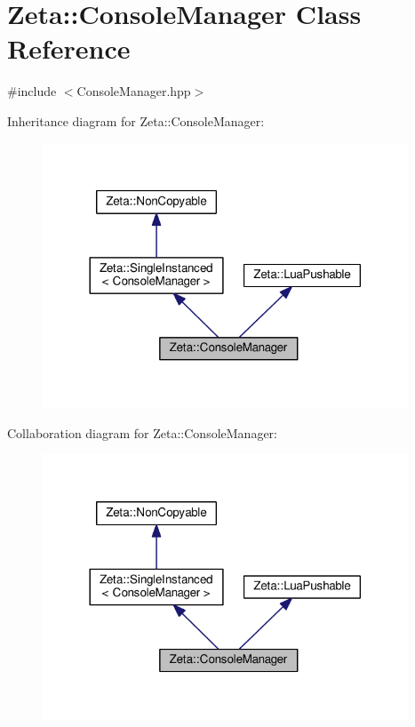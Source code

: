 \hypertarget{classZeta_1_1ConsoleManager}{\section{Zeta\+:\+:Console\+Manager Class Reference}
\label{classZeta_1_1ConsoleManager}
}


{\ttfamily \#include $<$Console\+Manager.\+hpp$>$}



Inheritance diagram for Zeta\+:\+:Console\+Manager\+:\nopagebreak
\begin{figure}[H]
\begin{center}
\leavevmode
\includegraphics[width=308pt]{classZeta_1_1ConsoleManager__inherit__graph}
\end{center}
\end{figure}


Collaboration diagram for Zeta\+:\+:Console\+Manager\+:\nopagebreak
\begin{figure}[H]
\begin{center}
\leavevmode
\includegraphics[width=308pt]{classZeta_1_1ConsoleManager__coll__graph}
\end{center}
\end{figure}

